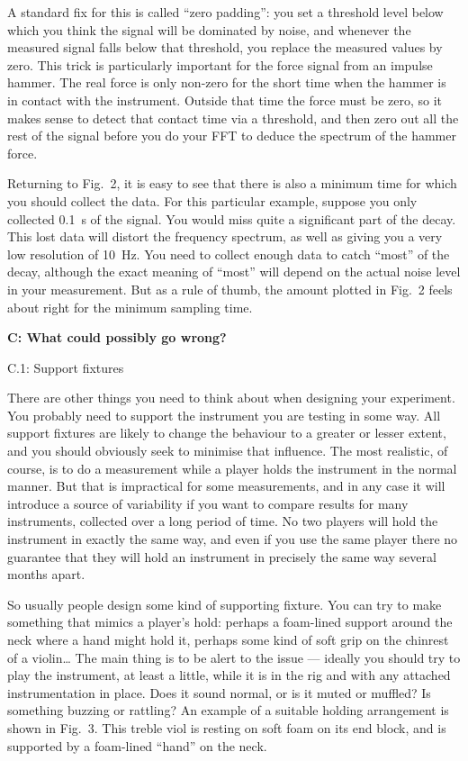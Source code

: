   A standard fix for this is called “zero padding”: you set a threshold level 
  below which you think the signal will be dominated by noise, and whenever the 
  measured signal falls below that threshold, you replace the measured values 
  by zero. This trick is particularly important for the force signal from an 
  impulse hammer. The real force is only non-zero for the short time when the 
  hammer is in contact with the instrument. Outside that time the force must be 
  zero, so it makes sense to detect that contact time via a threshold, and then 
  zero out all the rest of the signal before you do your FFT to deduce the 
  spectrum of the hammer force. 

  Returning to Fig.\ 2, it is easy to see that there is also a minimum time for 
  which you should collect the data. For this particular example, suppose you 
  only collected 0.1~s of the signal. You would miss quite a significant part 
  of the decay. This lost data will distort the frequency spectrum, as well as 
  giving you a very low resolution of 10~Hz. You need to collect enough data to 
  catch “most” of the decay, although the exact meaning of “most” will depend 
  on the actual noise level in your measurement. But as a rule of thumb, the 
  amount plotted in Fig.\ 2 feels about right for the minimum sampling time. 

  \textbf{C: What could possibly go wrong?} 

  C.1: Support fixtures 

  There are other things you need to think about when designing your 
  experiment. You probably need to support the instrument you are testing in 
  some way. All support fixtures are likely to change the behaviour to a 
  greater or lesser extent, and you should obviously seek to minimise that 
  influence. The most realistic, of course, is to do a measurement while a 
  player holds the instrument in the normal manner. But that is impractical for 
  some measurements, and in any case it will introduce a source of variability 
  if you want to compare results for many instruments, collected over a long 
  period of time. No two players will hold the instrument in exactly the same 
  way, and even if you use the same player there no guarantee that they will 
  hold an instrument in precisely the same way several months apart. 

  So usually people design some kind of supporting fixture. You can try to make 
  something that mimics a player’s hold: perhaps a foam-lined support around 
  the neck where a hand might hold it, perhaps some kind of soft grip on the 
  chinrest of a violin… The main thing is to be alert to the issue — ideally 
  you should try to play the instrument, at least a little, while it is in the 
  rig and with any attached instrumentation in place. Does it sound normal, or 
  is it muted or muffled? Is something buzzing or rattling? An example of a 
  suitable holding arrangement is shown in Fig.\ 3. This treble viol is resting 
  on soft foam on its end block, and is supported by a foam-lined ``hand'' on 
  the neck. 

